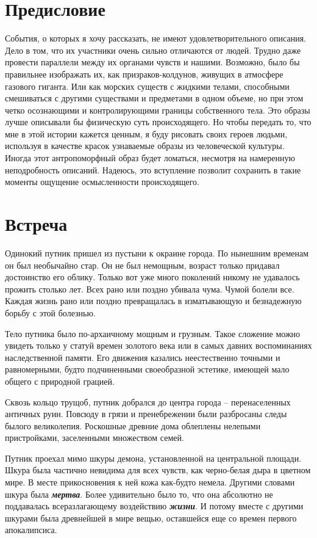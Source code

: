 \documentclass[12pt,a4paper]{article}
\begin{document}
\section*{Предисловие}

События, о которых я хочу рассказать, не имеют удовлетворительного описания. Дело в том, что их участники очень сильно отличаются от людей. Трудно даже провести параллели между их органами чувств и нашими. Возможно, было бы правильнее изображать их, как призраков-колдунов, живущих в атмосфере газового гиганта. Или как морских существ с жидкими телами, способными  смешиваться с другими существами и предметами в одном объеме, но при этом четко осознающими и контролирующими границы собственного тела. Это образы лучше описывали бы физическую суть происходящего. Но чтобы передать то, что мне в этой истории кажется ценным, я буду рисовать своих героев людьми, используя в качестве красок узнаваемые образы из человеческой культуры. Иногда этот антропоморфный образ будет ломаться, несмотря на намеренную неподробность описаний. Надеюсь, это вступление позволит сохранить в такие моменты ощущение осмысленности происходящего.

\section*{Встреча}

Одинокий путник пришел из пустыни к окраине города. По нынешним временам он был необычайно стар. Он не был немощным, возраст только придавал достоинство его облику. Только вот уже много поколений никому не удавалось прожить столько лет. Всех рано или поздно убивала чума. Чумой болели все. Каждая жизнь рано или поздно превращалась в изматывающую и безнадежную борьбу с этой болезнью.

Тело путника было по-архаичному мощным и грузным. Такое сложение можно увидеть только у статуй времен золотого века или в самых давних воспоминаниях наследственной памяти. Его движения казались неестественно точными и равномерными, будто подчиненными своеобразной эстетике, имеющей мало общего с природной грацией.

Сквозь кольцо трущоб, путник добрался до центра города -- перенаселенных античных руин. Повсюду в грязи и пренебрежении были разбросаны следы былого великолепия. Роскошные древние дома облеплены нелепыми пристройками, заселенными множеством семей.

Путник проехал мимо шкуры демона, установленной на центральной площади. Шкура была частично невидима для всех чувств, как черно-белая дыра в цветном мире. В месте прикосновения к ней кожа как-будто немела. Другими словами шкура была \textbf{\textit{мертва}}. Более удивительно было то, что она абсолютно не поддавалась всеразлагающему воздействию \textbf{\textit{жизни}}. И потому вместе с другими шкурами была древнейшей в мире вещью, оставшейся еще со времен первого апокалипсиса.
\end{document}
